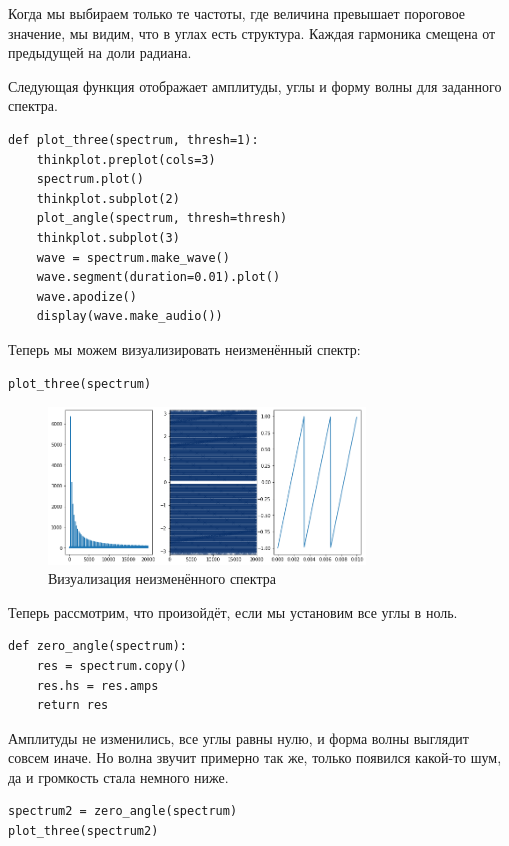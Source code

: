 \documentclass[a4paper,12pt]{report}
\begin{document}
Когда мы выбираем только те частоты, где величина превышает пороговое значение, мы видим, что в углах есть структура. Каждая гармоника смещена от предыдущей на доли радиана.

Следующая функция отображает амплитуды, углы и форму волны для заданного спектра.

\begin{lstlisting}[caption=Функция \texttt{plot\_three}]
def plot_three(spectrum, thresh=1):
    thinkplot.preplot(cols=3)
    spectrum.plot()
    thinkplot.subplot(2)
    plot_angle(spectrum, thresh=thresh)
    thinkplot.subplot(3)
    wave = spectrum.make_wave()
    wave.segment(duration=0.01).plot()
    wave.apodize()
    display(wave.make_audio())
\end{lstlisting}

Теперь мы можем визуализировать неизменённый спектр:

\begin{lstlisting}[caption=Визуализация неизменённого спектра]
plot_three(spectrum)
\end{lstlisting}

\begin{figure}[H]
        \centering
        \includegraphics[width=0.75\textwidth]{lab6_fig3_5.png}
        \caption{Визуализация неизменённого спектра}
        \label{fig:lab6_fig3_5}
\end{figure}

Теперь рассмотрим, что произойдёт, если мы установим все углы в ноль.

\begin{lstlisting}[caption=Функция \texttt{zero\_angle}]
def zero_angle(spectrum):
    res = spectrum.copy()
    res.hs = res.amps
    return res
\end{lstlisting}

Амплитуды не изменились, все углы равны нулю, и форма волны выглядит совсем иначе. Но волна звучит примерно так же, только появился какой-то шум, да и громкость стала немного ниже.

\begin{lstlisting}[caption=Визуализация при нулевых углах]
spectrum2 = zero_angle(spectrum)
plot_three(spectrum2)
\end{lstlisting}
\end{document}
